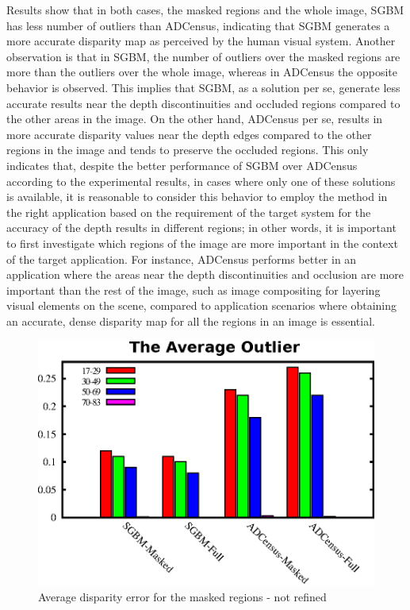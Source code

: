 Results show that in both cases, the masked regions and the whole image, SGBM has less number of outliers than ADCensus, indicating that
SGBM generates a more accurate disparity map as perceived by the human visual system.
Another observation is that in SGBM, the number of outliers over the masked regions are more than the outliers over the whole image, whereas in ADCensus the
opposite behavior is observed. This implies that SGBM, as a solution per se, generate less accurate results
near the depth discontinuities and occluded regions compared to the other areas in the image.
On the other hand, ADCensus per se, results in more accurate disparity values near the depth edges compared to the other regions in the image and 
tends to preserve the occluded regions. This only indicates that, despite the better performance of SGBM over ADCensus according to the
experimental results, in cases where only one of these solutions is available, it is reasonable to consider this behavior to employ the method
in the right application based on the requirement of the target system for the accuracy of the depth results in different regions; in other
words, it is important to first investigate which regions of the image are more important in the context of the target application.
For instance, ADCensus performs better in an application where the areas
near the depth discontinuities and occlusion are more important than the rest of the image, such as image compositing for layering visual elements
on the scene, compared to application scenarios where obtaining an accurate, dense disparity map for all the regions in an image is essential.

\begin{figure}[H]
\centering
\includegraphics[scale=0.9]{outlchart}
\caption{Average disparity error for the masked regions - not refined}
\label{fig:outlbar}
\end{figure} 

